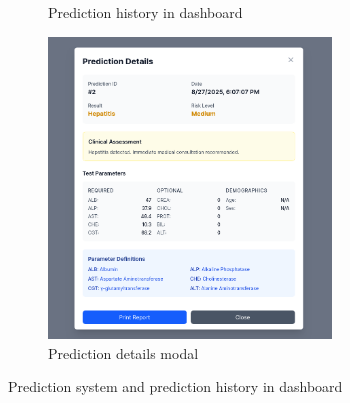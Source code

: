 \begin{figure}[htbp]
\begin{subfigure}{0.5\textwidth}
    \caption{Prediction history in dashboard}
    \label{fig:dashboard}
  \end{subfigure}
  \begin{subfigure}{0.5\textwidth}
    \includegraphics[width=0.9\linewidth, height=8cm]{figures/site/details.png}
    \caption{Prediction details modal}
    \label{fig:details}
  \end{subfigure}
  \caption{Prediction system and prediction history in dashboard}
  \label{fig:image2}
\end{figure}


